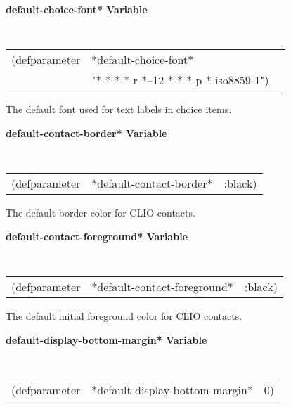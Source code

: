 {\samepage
{\large {\bf *default-choice-font* \hfill Variable}} 
\begin{flushright} \parbox[t]{6.125in}{
\tt
\begin{tabular}{lll}
\raggedright
(defparameter & *default-choice-font* \\
& "*-*-*-*-r-*--12-*-*-*-p-*-iso8859-1")
\end{tabular}
\rm

}\end{flushright}}

\begin{flushright} \parbox[t]{6.125in}{
The default font used for text labels in choice items.

}\end{flushright}
 
{\samepage
{\large {\bf *default-contact-border* \hfill Variable}} 
\begin{flushright} \parbox[t]{6.125in}{
\tt
\begin{tabular}{lll}
\raggedright
(defparameter & *default-contact-border* & :black)
\end{tabular}
\rm

}\end{flushright}}

\begin{flushright} \parbox[t]{6.125in}{
The default border color for CLIO contacts.

}\end{flushright}

{\samepage
{\large {\bf *default-contact-foreground* \hfill Variable}} 
\begin{flushright} \parbox[t]{6.125in}{
\tt
\begin{tabular}{lll}
\raggedright
(defparameter & *default-contact-foreground* & :black)
\end{tabular}
\rm

}\end{flushright}}

\begin{flushright} \parbox[t]{6.125in}{
The default initial foreground color for CLIO contacts.

}\end{flushright}

{\samepage
{\large {\bf *default-display-bottom-margin* \hfill Variable}} 
\begin{flushright} \parbox[t]{6.125in}{
\tt
\begin{tabular}{lll}
\raggedright
(defparameter & *default-display-bottom-margin* & 0)
\end{tabular}
\rm

}\end{flushright}}

